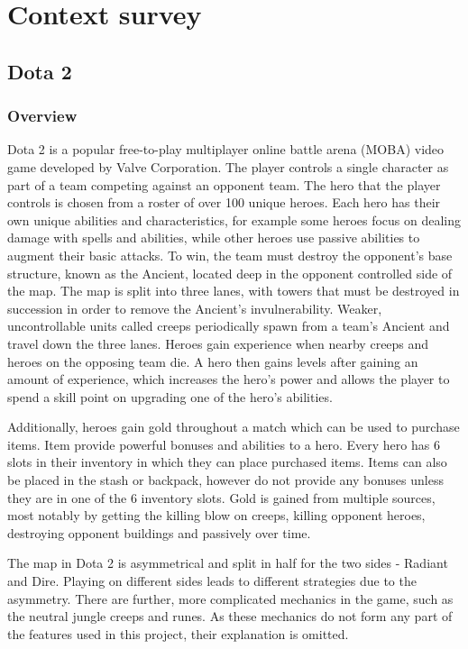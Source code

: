\documentclass[Report.tex]{subfiles}
\begin{document}
\section{Context survey}


\subsection{Dota 2}
\subsubsection{Overview}
Dota 2 is a popular free-to-play multiplayer online battle arena (MOBA) video game developed by Valve Corporation. The player controls a single character as part of a team competing against an opponent team. The hero that the player controls is chosen from a roster of over 100 unique heroes. Each hero has their own unique abilities and characteristics, for example some heroes focus on dealing damage with spells and abilities, while other heroes use passive abilities to augment their basic attacks. To win, the team must destroy the opponent's base structure, known as the Ancient, located deep in the opponent controlled side of the map. The map is split into three lanes, with towers that must be destroyed in succession in order to remove the Ancient's invulnerability. Weaker, uncontrollable units called creeps periodically spawn from a team's Ancient and travel down the three lanes. Heroes gain experience when nearby creeps and heroes on the opposing team die. A hero then gains levels after gaining an amount of experience, which increases the hero's power and allows the player to spend a skill point on upgrading one of the hero's abilities. 

Additionally, heroes gain gold throughout a match which can be used to purchase items. Item provide powerful bonuses and abilities to a hero. Every hero has 6 slots in their inventory in which they can place purchased items. Items can also be placed in the stash or backpack, however do not provide any bonuses unless they are in one of the 6 inventory slots. Gold is gained from multiple sources, most notably by getting the killing blow on creeps, killing opponent heroes, destroying opponent buildings and passively over time. 


The map in Dota 2 is asymmetrical and split in half for the two sides - Radiant and Dire. Playing on different sides leads to different strategies due to the asymmetry. There are further, more complicated mechanics in the game, such as the neutral jungle creeps and runes. As these mechanics do not form any part of the features used in this project, their explanation is omitted. 
\end{document}
